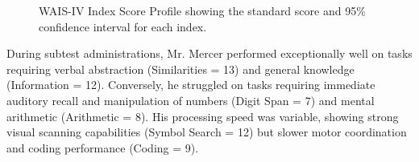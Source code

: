 \begin{figure}[H]
\caption{WAIS-IV Index Score Profile showing the standard score and 95\% confidence interval for each index.}
\label{fig:wais_profile}
\end{figure}

During subtest administrations, Mr. Mercer performed exceptionally well on tasks requiring verbal abstraction (Similarities = 13) and general knowledge (Information = 12). Conversely, he struggled on tasks requiring immediate auditory recall and manipulation of numbers (Digit Span = 7) and mental arithmetic (Arithmetic = 8). His processing speed was variable, showing strong visual scanning capabilities (Symbol Search = 12) but slower motor coordination and coding performance (Coding = 9).
